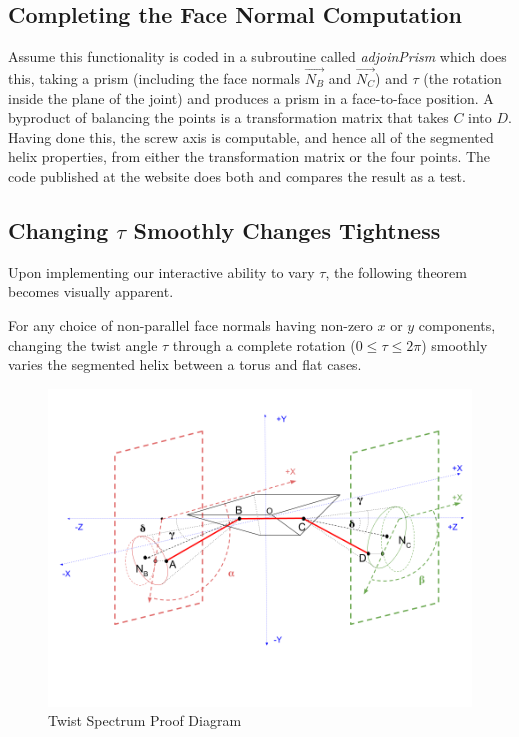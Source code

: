 \documentclass[mathematics,article,submit,pdftex,moreauthors]{Definitions/mdpi}
\begin{document}
\subsection{Completing the Face Normal Computation}
Assume this functionality
is coded in a subroutine called {\em adjoinPrism} which does this, taking a prism
(including the face normals $\overrightarrow{N_B}$ and $\overrightarrow{N_C}$) and $\tau$
(the rotation inside the plane of the joint) and produces a prism
in a face-to-face position. A byproduct
of balancing the points is a transformation matrix
that takes $C$ into $D$. Having done this, the screw axis is computable,
and hence all of the segmented helix properties,
from either the transformation matrix or the four points.
The code published at the website does both and compares the result as a test.

\subsection{Changing $\tau$ Smoothly Changes Tightness}

Upon implementing our interactive ability to vary $\tau$, the following
theorem becomes visually apparent.

\begin{Theorem}
  For any choice of non-parallel face normals having non-zero $x$ or $y$ components,
  changing the twist angle $\tau$ through a complete rotation ($0 \leq \tau \leq 2\pi$)
  smoothly varies the segmented helix
  between a torus and flat cases.
  \label{thm:twistspectrum}
\end{Theorem}




\begin{figure}
  \centering
  \captionsetup{justification=centering}
     \includegraphics[width=10 cm]{figures/TwistSpectrumGeneral.png}
     \caption{Twist Spectrum Proof Diagram}
  \label{fig:twistspectrum}
\end{figure}
\unskip
\end{document}
